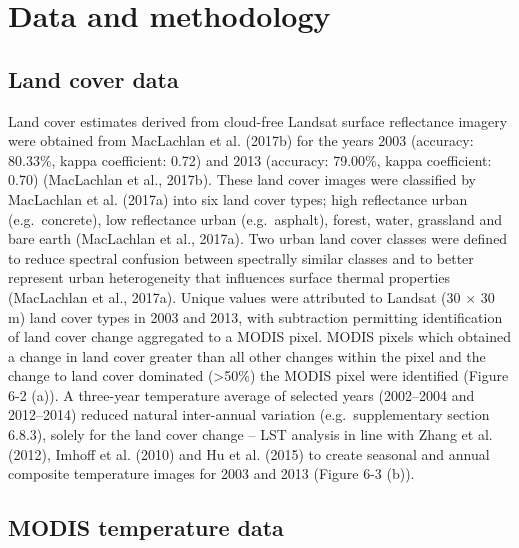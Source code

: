 \documentclass[]{book}
\begin{document}
\section{Data and methodology}\label{data-and-methodology}

\subsection{Land cover data}\label{land-cover-data}

Land cover estimates derived from cloud-free Landsat surface reflectance
imagery were obtained from MacLachlan et al. (2017b) for the years 2003
(accuracy: 80.33\%, kappa coefficient: 0.72) and 2013 (accuracy:
79.00\%, kappa coefficient: 0.70) (MacLachlan et al., 2017b). These land
cover images were classified by MacLachlan et al. (2017a) into six land
cover types; high reflectance urban (e.g.~concrete), low reflectance
urban (e.g.~asphalt), forest, water, grassland and bare earth
(MacLachlan et al., 2017a). Two urban land cover classes were defined to
reduce spectral confusion between spectrally similar classes and to
better represent urban heterogeneity that influences surface thermal
properties (MacLachlan et al., 2017a). Unique values were attributed to
Landsat (30 × 30 m) land cover types in 2003 and 2013, with subtraction
permitting identification of land cover change aggregated to a MODIS
pixel. MODIS pixels which obtained a change in land cover greater than
all other changes within the pixel and the change to land cover
dominated (\textgreater{}50\%) the MODIS pixel were identified (Figure
6-2 (a)). A three-year temperature average of selected years (2002--2004
and 2012--2014) reduced natural inter-annual variation
(e.g.~supplementary section 6.8.3), solely for the land cover change --
LST analysis in line with Zhang et al. (2012), Imhoff et al. (2010) and
Hu et al. (2015) to create seasonal and annual composite temperature
images for 2003 and 2013 (Figure 6-3 (b)).

\subsection{MODIS temperature data}\label{modis-temperature-data}
\end{document}
